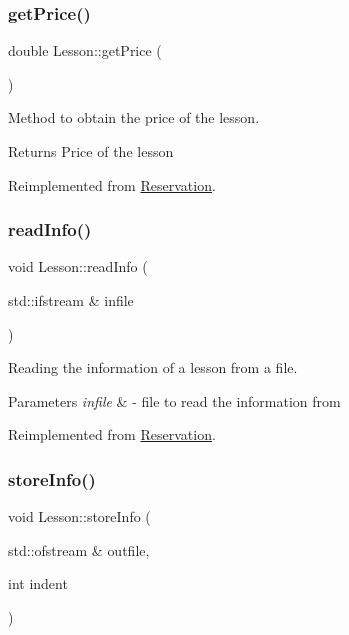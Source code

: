 \subsubsection{\texorpdfstring{get\+Price()}{getPrice()}}
{\footnotesize\ttfamily double Lesson\+::get\+Price (\begin{DoxyParamCaption}{ }\end{DoxyParamCaption})\hspace{0.3cm}{\ttfamily [virtual]}}



Method to obtain the price of the lesson. 

\begin{DoxyReturn}{Returns}
Price of the lesson 
\end{DoxyReturn}


Reimplemented from \mbox{\hyperlink{class_reservation_a62cdb2f1a24e2fce92fb9f024ae9f494}{Reservation}}.

\mbox{\label{class_lesson_a3ac64e2f79bc9e381634d5d30499e8f1}} 
\subsubsection{\texorpdfstring{read\+Info()}{readInfo()}}
{\footnotesize\ttfamily void Lesson\+::read\+Info (\begin{DoxyParamCaption}\item[{std\+::ifstream \&}]{infile }\end{DoxyParamCaption})\hspace{0.3cm}{\ttfamily [virtual]}}



Reading the information of a lesson from a file. 


\begin{DoxyParams}{Parameters}
{\em infile} & -\/ file to read the information from \\
\hline
\end{DoxyParams}


Reimplemented from \mbox{\hyperlink{class_reservation_acff32024a350c2156af9f74522c59b7b}{Reservation}}.

\mbox{\label{class_lesson_a645855060ab3c915a6e0875bc5584887}} 
\subsubsection{\texorpdfstring{store\+Info()}{storeInfo()}}
{\footnotesize\ttfamily void Lesson\+::store\+Info (\begin{DoxyParamCaption}\item[{std\+::ofstream \&}]{outfile,  }\item[{int}]{indent }\end{DoxyParamCaption})\hspace{0.3cm}{\ttfamily [virtual]}}



